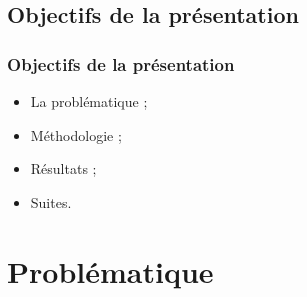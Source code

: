             \subsection{Objectifs de la présentation} 
		\begin{frame}[allowframebreaks]
			\frametitle{Objectifs de la présentation}
			\begin {itemize}
				
                                \item La problématique ;
                                \item Méthodologie ;
                                \item Résultats ;
                                \item Suites. 
                        \end{itemize}
		\end{frame}

               \section{Problématique} 
		

